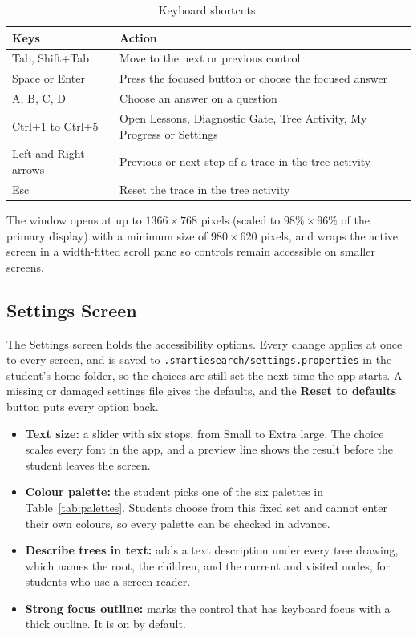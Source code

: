 \begin{table}[H]
\centering
\small
\caption{Keyboard shortcuts.}
\label{tab:shortcuts}
\begin{tabularx}{\textwidth}{p{4.2cm} X}
\toprule
Keys & Action \\
\midrule
Tab, Shift+Tab & Move to the next or previous control \\
Space or Enter & Press the focused button or choose the focused answer \\
A, B, C, D & Choose an answer on a question \\
Ctrl+1 to Ctrl+5 & Open Lessons, Diagnostic Gate, Tree Activity, My Progress or Settings \\
Left and Right arrows & Previous or next step of a trace in the tree activity \\
Esc & Reset the trace in the tree activity \\
\bottomrule
\end{tabularx}
\end{table}

The window opens at up to $1366 \times 768$ pixels (scaled to $98\% \times 96\%$ of the primary display) with a minimum size of $980 \times 620$ pixels, and wraps the active screen in a width-fitted scroll pane so controls remain accessible on smaller screens.
\subsection{Settings Screen}\label{sec:settings}
The Settings screen holds the accessibility options. Every change applies at once to every screen, and is saved to \texttt{.smartiesearch/settings.properties} in the student's home folder, so the choices are still set the next time the app starts. A missing or damaged settings file gives the defaults, and the \textbf{Reset to defaults} button puts every option back.

\begin{itemize}
    \item \textbf{Text size:} a slider with six stops, from Small to Extra large. The choice scales every font in the app, and a preview line shows the result before the student leaves the screen.
    \item \textbf{Colour palette:} the student picks one of the six palettes in Table~\ref{tab:palettes}. Students choose from this fixed set and cannot enter their own colours, so every palette can be checked in advance.
    \item \textbf{Describe trees in text:} adds a text description under every tree drawing, which names the root, the children, and the current and visited nodes, for students who use a screen reader.
    \item \textbf{Strong focus outline:} marks the control that has keyboard focus with a thick outline. It is on by default.
\end{itemize}

